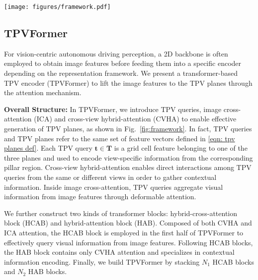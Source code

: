 \documentclass[10pt,twocolumn,letterpaper]{article}
\begin{document}
\begin{figure*}[t]
\centering
\texttt{[image: figures/framework.pdf]}
\vspace{-7mm}
\caption{Framework of the proposed TPVFormer for 3D semantic occupancy prediction.
We employ an image backbone network to extract multi-scale features for multi-camera images. 
We then perform cross-attention to adaptively lift 2D features to the TPV space and use cross-view hybrid attention to enable the interactions between TPV planes.
To predict the semantic occupancy of a point in the 3D space, we apply a lightweight prediction head on the sum of projected features on the three TPV planes.
}
\label{fig:framework}
\vspace{-6mm}
\end{figure*}

\subsection{TPVFormer}
For vision-centric autonomous driving perception, a 2D backbone is often employed to obtain image features before feeding them into a specific encoder depending on the representation framework.
We present a transformer-based TPV encoder (TPVFormer) to lift the image features to the TPV planes through the attention mechanism.

\textbf{Overall Structure:}
In TPVFormer, we introduce TPV queries, image cross-attention (ICA) and cross-view hybrid-attention (CVHA) to enable effective generation of TPV planes, as shown in Fig.~\ref{fig:framework}.
In fact, TPV queries and TPV planes refer to the same set of feature vectors defined in \eqref{eqn: tpv planes def}.
Each TPV query $\mathbf{t}\in\mathbf{T}$ is a grid cell feature belonging to one of the three planes and used to encode view-specific information from the corresponding pillar region.
Cross-view hybrid-attention enables direct interactions among TPV queries from the same or different views in order to gather contextual information.
Inside image cross-attention, TPV queries aggregate visual information from image features through deformable attention.

We further construct two kinds of transformer blocks: hybrid-cross-attention block (HCAB) and hybrid-attention block (HAB).
Composed of both CVHA and ICA attention, the HCAB block is employed in the first half of TPVFormer to effectively query visual information from image features.
Following HCAB blocks, the HAB block contains only CVHA attention and specializes in contextual information encoding. 
Finally, we build TPVFormer by stacking $N_1$ HCAB blocks and $N_2$ HAB blocks.
\end{document}
